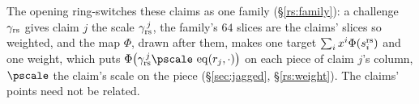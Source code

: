 The opening ring-switches these claims as one family (\S\ref{rs:family}): a challenge $\gamma_{\mathrm{rs}}$ gives claim $j$ the scale $\gamma_{\mathrm{rs}}^{\,j}$, the family's $64$ slices are the claims' slices so weighted, and the map $\Phi$, drawn after them, makes one target $\sum_ix^i\Phi(s^{\mathrm{rs}}_{i})$ and one weight, which puts $\Phi\bigl(\rsgamma^{\,j}\pscale\,\eq(r_j,\cdot)\bigr)$ on each piece of claim $j$'s column, $\pscale$ the claim's scale on the piece (\S\ref{sec:jagged}, \S\ref{rs:weight}). The claims' points need not be related.
